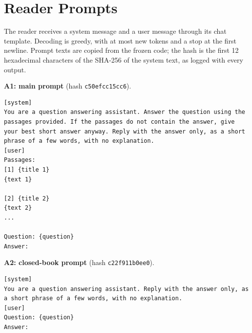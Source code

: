 \appendix
\setcounter{topnumber}{4}\setcounter{dbltopnumber}{3}\setcounter{totalnumber}{6}
\renewcommand{\topfraction}{0.95}\renewcommand{\dbltopfraction}{0.95}
\renewcommand{\textfraction}{0.05}\renewcommand{\floatpagefraction}{0.75}\renewcommand{\dblfloatpagefraction}{0.75}

\FloatBarrier
\section{Reader Prompts}
\label{app:prompts}
The reader receives a system message and a user message through its chat template.
Decoding is greedy, with at most  new tokens and a stop at the first newline.
Prompt texts are copied from the frozen code; the hash is the first 12 hexadecimal characters of the SHA-256 of the system text, as logged with every output.

\noindent\textbf{A1: main prompt} (hash \texttt{c50efcc15cc6}).\par
\par\noindent\begin{minipage}{\linewidth}
\begin{lstlisting}
[system]
You are a question answering assistant. Answer the question using the passages provided. If the passages do not contain the answer, give your best short answer anyway. Reply with the answer only, as a short phrase of a few words, with no explanation.
[user]
Passages:
[1] {title 1}
{text 1}

[2] {title 2}
{text 2}
...

Question: {question}
Answer:
\end{lstlisting}
\end{minipage}\par

\noindent\textbf{A2: closed-book prompt} (hash \texttt{c22f911b0ee0}).\par
\par\noindent\begin{minipage}{\linewidth}
\begin{lstlisting}
[system]
You are a question answering assistant. Reply with the answer only, as a short phrase of a few words, with no explanation.
[user]
Question: {question}
Answer:
\end{lstlisting}
\end{minipage}\par

